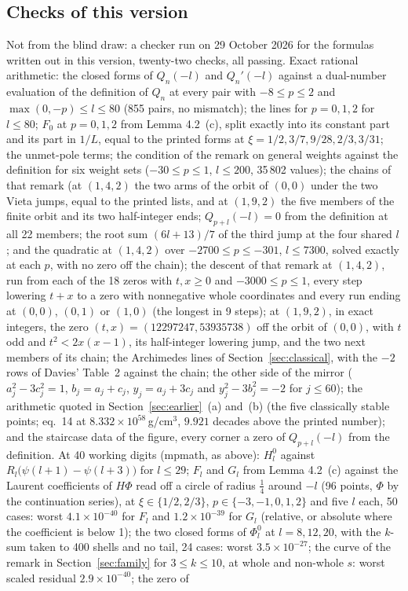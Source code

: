 \documentclass[11pt]{article}
\begin{document}
\par\endgroup

\subsection{Checks of this version}\label{sec:r5check}

Not from the blind draw: a checker run on 29 October 2026 for the formulas written out in this version, twenty-two checks, all passing. Exact rational arithmetic: the closed forms of $Q_n(-l)$ and $Q_n'(-l)$ against a dual-number evaluation of the definition of $Q_n$ at every pair with $-8\le p\le2$ and $\max(0,-p)\le l\le80$ (855 pairs, no mismatch); the lines for $p=0,1,2$ for $l\le80$; $F_0$ at $p=0,1,2$ from Lemma 4.2~(c), split exactly into its constant part and its part in $1/L$, equal to the printed forms at $\xi=1/2,3/7,9/28,2/3,3/31$; the unmet-pole terms; the condition of the remark on general weights against the definition for six weight sets ($-30\le p\le1$, $l\le200$, 35\,802 values); the chains of that remark (at $(1,4,2)$ the two arms of the orbit of $(0,0)$ under the two Vieta jumps, equal to the printed lists, and at $(1,9,2)$ the five members of the finite orbit and its two half-integer ends; $Q_{p+l}(-l)=0$ from the definition at all 22 members; the root sum $(6l+13)/7$ of the third jump at the four shared $l$; and the quadratic at $(1,4,2)$ over $-2700\le p\le-301$, $l\le7300$, solved exactly at each $p$, with no zero off the chain); the descent of that remark at $(1,4,2)$, run from each of the 18 zeros with $t,x\ge0$ and $-3000\le p\le1$, every step lowering $t+x$ to a zero with nonnegative whole coordinates and every run ending at $(0,0)$, $(0,1)$ or $(1,0)$ (the longest in 9 steps); at $(1,9,2)$, in exact integers, the zero $(t,x)=(12297247,53935738)$ off the orbit of $(0,0)$, with $t$ odd and $t^2<2x(x-1)$, its half-integer lowering jump, and the two next members of its chain; the Archimedes lines of Section~\ref{sec:classical}, with the $-2$ rows of Davies' Table~2 against the chain; the other side of the mirror ($a_j^2-3c_j^2=1$, $b_j=a_j+c_j$, $y_j=a_j+3c_j$ and $y_j^2-3b_j^2=-2$ for $j\le60$); the arithmetic quoted in Section~\ref{sec:earlier}~(a) and~(b) (the five classically stable points; eq.~14 at $8.332\times10^{58}$\,g/cm$^3$, $9.921$ decades above the printed number); and the staircase data of the figure, every corner a zero of $Q_{p+l}(-l)$ from the definition. At 40 working digits (mpmath, as above): $H^0_l$ against $R_l\bigl(\psi(l+1)-\psi(l+3)\bigr)$ for $l\le29$; $F_l$ and $G_l$ from Lemma 4.2~(c) against the Laurent coefficients of $H\Phi$ read off a circle of radius $\frac14$ around $-l$ (96 points, $\Phi$ by the continuation series), at $\xi\in\{1/2,2/3\}$, $p\in\{-3,-1,0,1,2\}$ and five $l$ each, 50 cases: worst $4.1\times10^{-40}$ for $F_l$ and $1.2\times10^{-39}$ for $G_l$ (relative, or absolute where the coefficient is below 1); the two closed forms of $\Phi^0_l$ at $l=8,12,20$, with the $k$-sum taken to 400 shells and no tail, 24 cases: worst $3.5\times10^{-27}$; the curve of the remark in Section~\ref{sec:family} for $3\le k\le10$, at whole and non-whole $s$: worst scaled residual $2.9\times10^{-40}$; the zero of 
\end{document}
